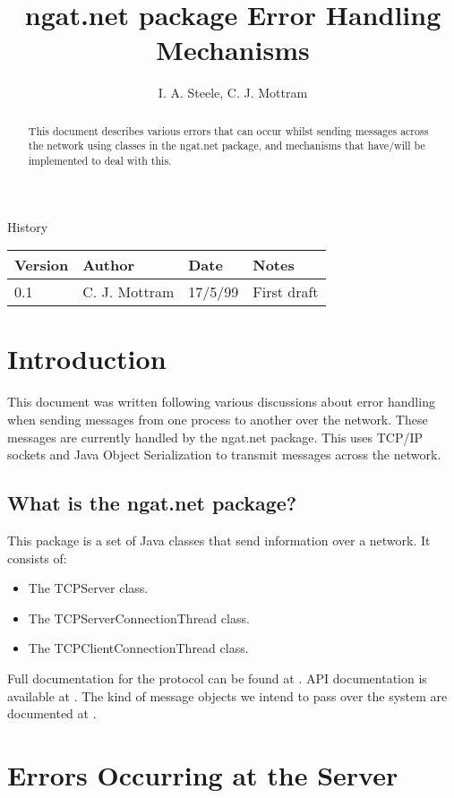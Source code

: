 \documentclass[10pt,a4paper]{article}
\title{ngat.net package Error Handling Mechanisms}
\author{I. A. Steele, C. J. Mottram}
\date{}
\begin{document}
\thispagestyle{empty}
\maketitle
\begin{abstract}
This document describes various errors that can occur whilst sending messages across the network using
 classes in the ngat.net package, and mechanisms that have/will be implemented to deal with this.
\end{abstract}

\centerline{\Large History}
\begin{center}
\begin{tabular}{|l|l|l|p{15em}|}
\hline
{\bf Version} & {\bf Author} & {\bf Date} & {\bf Notes} \\
\hline
0.1 &              C. J. Mottram & 17/5/99 & First draft \\
\hline
\end{tabular}
\end{center}

\newpage
\tableofcontents
\listoftables
\newpage

\section{Introduction}
This document was written following various discussions about error handling when sending
messages from one process to another over the network. These messages are currently handled
by the ngat.net package. This uses TCP/IP sockets and Java Object Serialization to transmit
messages across the network. 
\subsection{What is the ngat.net package?}
This package is a set of Java classes that send information over a network.
It consists of:
\begin{itemize}
\item The TCPServer class.
\item The TCPServerConnectionThread class.
\item The TCPClientConnectionThread class.
\end{itemize}
Full documentation for the protocol can be found at \cite{bib:ngatnetlatex}. API documentation is available at
\cite{bib:ngatnettree}. The kind of message objects we intend to pass over the system are documented at
\cite{bib:jmsdd}.


\section{Errors Occurring at the Server}
\end{document}
